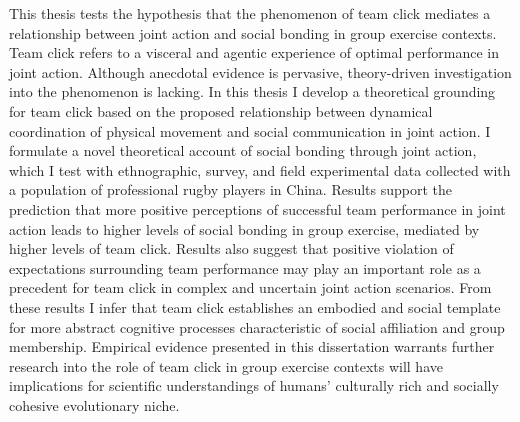 This thesis tests the hypothesis that the phenomenon of team click mediates a relationship between joint action and social bonding in group exercise contexts.  Team click refers to a visceral and agentic experience of optimal performance in joint action.  Although anecdotal evidence is pervasive, theory-driven investigation into the phenomenon is lacking.  In this thesis I develop a theoretical grounding for team click based on the proposed relationship between dynamical coordination of physical movement and social communication in joint action.  I formulate a novel theoretical account of social bonding through joint action, which I test with ethnographic, survey, and field experimental data collected with a population of professional rugby players in China.  Results support the prediction that more positive perceptions of successful team performance in joint action leads to higher levels of social bonding in group exercise, mediated by higher levels of team click.  Results also suggest that positive violation of expectations surrounding team performance may play an important role as a precedent for team click in complex and uncertain joint action scenarios.  From these results I infer that team click establishes an embodied and social template for more abstract cognitive processes characteristic of social affiliation and group membership.  Empirical evidence presented in this dissertation warrants further research into  the role of team click in group exercise contexts will have implications for scientific understandings of humans' culturally rich and socially cohesive evolutionary niche.

